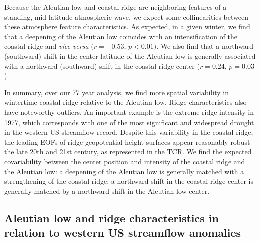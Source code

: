 \documentclass[final, double]{ua-thesis}
\begin{document}
Because the Aleutian low and coastal ridge are neighboring features of a standing, mid-latitude atmospheric wave, we expect some collinearities between these atmosphere feature characteristics. As expected, in a given winter, we find that a deepening of the Aleutian low coincides with an intensification of the coastal ridge and \textit{vice versa} ($r = -0.53$, $p < 0.01)$. We also find that a northward (southward) shift in the center latitude of the Aleutian low is generally associated with a northward (southward) shift in the coastal ridge center ($r = 0.24$, $p = 0.03$).

In summary, over our 77 year analysis, we find more spatial variability in wintertime coastal ridge relative to the Aleutian low. Ridge characteristics also have noteworthy outliers. An important example is the extreme ridge intensity in 1977, which corresponds with one of the most significant and widespread drought in the western US streamflow record. Despite this variability in the coastal ridge, the leading EOFs of ridge geopotential height surfaces appear reasonably robust the late 20th and 21st century, as represented in the TCR. We find the expected covariability between the center position and intensity of the coastal ridge and the Aleutian low: a deepening of the Aleutian low is generally matched with a strengthening of the coastal ridge; a northward shift in the coastal ridge center is generally matched by a northward shift in the Aleutian low center.

\subsection{Aleutian low and ridge characteristics in relation to western US streamflow anomalies}
\end{document}
